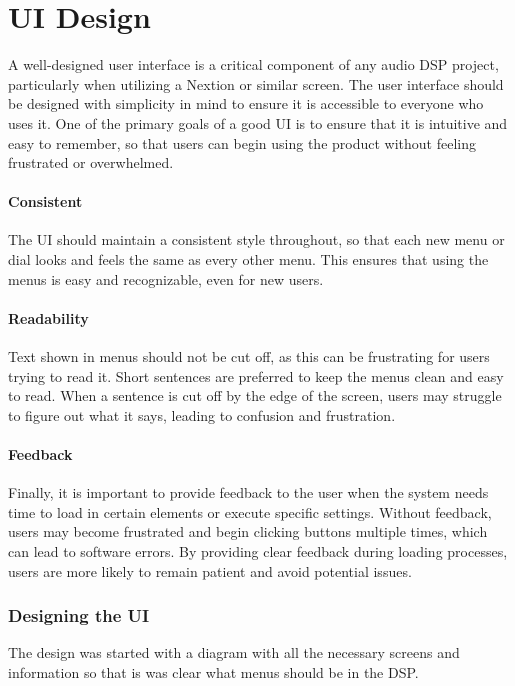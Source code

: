 \chapter*{UI Design} \label{UI_Design}
A well-designed user interface is a critical component of any audio DSP project, particularly when utilizing a Nextion or similar screen. The user interface should be designed with simplicity in mind to ensure it is accessible to everyone who uses it. One of the primary goals of a good UI is to ensure that it is intuitive and easy to remember, so that users can begin using the product without feeling frustrated or overwhelmed.

\subsubsection*{Consistent}
The UI should maintain a consistent style throughout, so that each new menu or dial looks and feels the same as every other menu. This ensures that using the menus is easy and recognizable, even for new users.

\subsubsection*{Readability}
Text shown in menus should not be cut off, as this can be frustrating for users trying to read it. Short sentences are preferred to keep the menus clean and easy to read. When a sentence is cut off by the edge of the screen, users may struggle to figure out what it says, leading to confusion and frustration.

\subsubsection*{Feedback}
Finally, it is important to provide feedback to the user when the system needs time to load in certain elements or execute specific settings. Without feedback, users may become frustrated and begin clicking buttons multiple times, which can lead to software errors. By providing clear feedback during loading processes, users are more likely to remain patient and avoid potential issues.

\subsection{Designing the UI}
The design was started with a diagram with all the necessary screens and information so that is was clear what menus should be in the DSP. 

